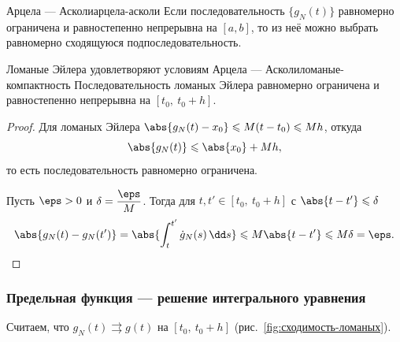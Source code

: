 \begin{Lemma}{Арцела --- Асколи}{арцела-асколи}
	Если последовательность $\{g_N(t)\}$ равномерно ограничена и
	равностепенно непрерывна на $[a,b]$, то из неё можно выбрать равномерно
	сходящуюся подпоследовательность.
\end{Lemma}

\begin{Lemma}{Ломаные Эйлера удовлетворяют условиям Арцела --- Асколи}{ломаные-компактность}
	Последовательность ломаных Эйлера равномерно ограничена и равностепенно
	непрерывна на $[t_0,\ t_0+h]$.
\end{Lemma}

\begin{proof}
	Для ломаных Эйлера $\abs{g_N(t) - x_0} \leqslant M(t - t_0) \leqslant Mh$, откуда
	\[
	\abs{g_N(t)} \leqslant \abs{x_0} + Mh,
	\]
	то есть последовательность равномерно ограничена.

	\medskip
	Пусть $\eps > 0$ и $\delta = \dfrac{\eps}{M}$. Тогда для
	$t, t' \in [t_0,\ t_0+h]$ с $\abs{t - t'} \leqslant \delta$
	\[
	\abs{g_N(t) - g_N(t')}
	= \abs{\int_{t}^{t'} \dot g_N(s)\,\dd s}
	\leqslant M\abs{t - t'} \leqslant M\delta = \eps.
	\]
\end{proof}

\subsubsection*{Предельная функция --- решение интегрального уравнения}

Считаем, что $g_N(t) \rightrightarrows g(t)$ на $[t_0,\ t_0+h]$
(рис.~\ref{fig:сходимость-ломаных}).

